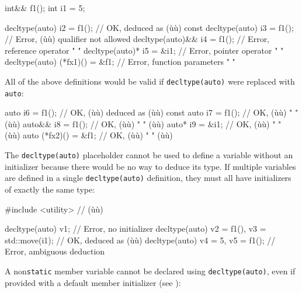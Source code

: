\begin{emcppslisting}[emcppsbatch=e3,emcppsstandards={c++14}]
int&& f1();
int i1 = 5;

decltype(auto)       i2     = f1();  // OK, deduced as (ù{}ù)
const decltype(auto) i3     = f1();  // Error, (ù{}ù) qualifier not allowed
decltype(auto)&&     i4     = f1();  // Error, reference operator "     "
decltype(auto)*      i5     = &i1;   // Error, pointer operator   "     "
decltype(auto)     (*fx1)() = &f1;   // Error, function parameters "    "
\end{emcppslisting}
    

All of the above definitions would be valid if \lstinline!decltype(auto)!
were replaced with \lstinline!auto!:

\begin{emcppslisting}[emcppsbatch=e3]
auto                 i6     = f1();  // OK, (ù{}ù) deduced as (ù{}ù)
const auto           i7     = f1();  // OK, (ù{}ù)    "     " (ù{}ù)
auto&&               i8     = f1();  // OK, (ù{}ù)    "     " (ù{}ù)
auto*                i9     = &i1;   // OK, (ù{}ù)    "     " (ù{}ù)
auto               (*fx2)() = &f1;   // OK, (ù{}ù)   "     " (ù{}ù)
\end{emcppslisting}
    

The \lstinline!decltype(auto)! placeholder cannot be used to define a
variable without an initializer because there would be no way to deduce
its type. If multiple variables are defined in a single
\lstinline!decltype(auto)! definition, they must all have initializers of
exactly the same type:

\begin{emcppslisting}[emcppsbatch=e3]
#include <utility>  // (ù{}ù)

decltype(auto) v1;                             // Error, no initializer
decltype(auto) v2 = f1(), v3 = std::move(i1);  // OK, deduced as (ù{}ù)
decltype(auto) v4 = 5, v5 = f1();              // Error, ambiguous deduction
\end{emcppslisting}
    

A non\lstinline!static! member variable cannot be declared using
\lstinline!decltype(auto)!, even if provided with a default member
initializer (see ):

